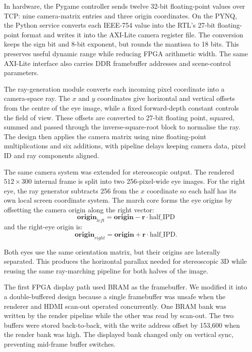In hardware, the Pygame controller sends twelve 32-bit floating-point values over TCP: nine camera-matrix entries and three origin coordinates. On the PYNQ, the Python service converts each IEEE-754 value into the RTL's 27-bit floating-point format and writes it into the AXI-Lite camera register file. The conversion keeps the sign bit and 8-bit exponent, but rounds the mantissa to 18 bits. This preserves useful dynamic range while reducing FPGA arithmetic width. The same AXI-Lite interface also carries DDR framebuffer addresses and scene-control parameters.

The ray-generation module converts each incoming pixel coordinate into a camera-space ray. The $x$ and $y$ coordinates give horizontal and vertical offsets from the centre of the eye image, while a fixed forward-depth constant controls the field of view. These offsets are converted to 27-bit floating point, squared, summed and passed through the inverse-square-root block to normalise the ray. The design then applies the camera matrix using nine floating-point multiplications and six additions, with pipeline delays keeping camera data, pixel ID and ray components aligned.

The same camera system was extended for stereoscopic output. The rendered $512 \times 300$ internal frame is split into two 256-pixel-wide eye images. For the right eye, the ray generator subtracts 256 from the $x$ coordinate so each half has its own local screen coordinate system. The march core forms the eye origins by offsetting the camera origin along the right vector:
\begin{equation}
\mathbf{origin}_{left} = \mathbf{origin} - \mathbf{r}\cdot\text{half\_IPD}
\end{equation}
and the right-eye origin is:
\begin{equation}
\mathbf{origin}_{right} = \mathbf{origin} + \mathbf{r}\cdot\text{half\_IPD}.
\end{equation}

Both eyes use the same orientation matrix, but their origins are laterally separated. This produces the horizontal parallax needed for stereoscopic 3D while reusing the same ray-marching pipeline for both halves of the image.

The first FPGA display path used BRAM as the framebuffer. We modified it into a double-buffered design because a single framebuffer was unsafe when the renderer and HDMI scan-out operated concurrently. One BRAM bank was written by the render pipeline while the other was read by scan-out. The two buffers were stored back-to-back, with the write address offset by 153,600 when the render bank was high. The displayed bank changed only on vertical sync, preventing mid-frame buffer switches.

